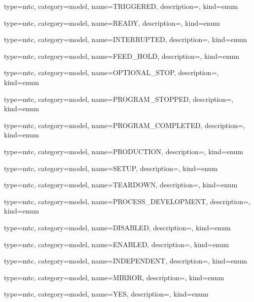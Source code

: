 {
  type=mtc,
  category=model,
  name={TRIGGERED},
  description={},
  kind={enum}
}


{
  type=mtc,
  category=model,
  name={READY},
  description={},
  kind={enum}
}


{
  type=mtc,
  category=model,
  name={INTERRUPTED},
  description={},
  kind={enum}
}


{
  type=mtc,
  category=model,
  name={FEED\_HOLD},
  description={},
  kind={enum}
}


{
  type=mtc,
  category=model,
  name={OPTIONAL\_STOP},
  description={},
  kind={enum}
}


{
  type=mtc,
  category=model,
  name={PROGRAM\_STOPPED},
  description={},
  kind={enum}
}


{
  type=mtc,
  category=model,
  name={PROGRAM\_COMPLETED},
  description={},
  kind={enum}
}


{
  type=mtc,
  category=model,
  name={PRODUCTION},
  description={},
  kind={enum}
}


{
  type=mtc,
  category=model,
  name={SETUP},
  description={},
  kind={enum}
}


{
  type=mtc,
  category=model,
  name={TEARDOWN},
  description={},
  kind={enum}
}


{
  type=mtc,
  category=model,
  name={PROCESS\_DEVELOPMENT},
  description={},
  kind={enum}
}


{
  type=mtc,
  category=model,
  name={DISABLED},
  description={},
  kind={enum}
}


{
  type=mtc,
  category=model,
  name={ENABLED},
  description={},
  kind={enum}
}


{
  type=mtc,
  category=model,
  name={INDEPENDENT},
  description={},
  kind={enum}
}


{
  type=mtc,
  category=model,
  name={MIRROR},
  description={},
  kind={enum}
}


{
  type=mtc,
  category=model,
  name={YES},
  description={},
  kind={enum}
}


